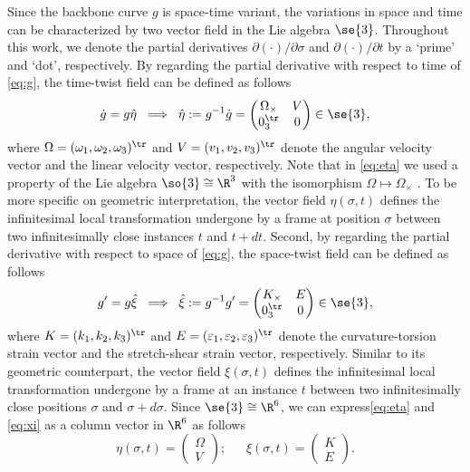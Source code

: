 Since the backbone curve $g$ is space-time variant, the variations in space and time can be characterized by two vector field in the Lie algebra $\se{3}$. Throughout this work, we denote the partial derivatives ${\partial (\cdot)}/{\partial \sigma}$ and ${\partial (\cdot)}/{\partial t}$  by a `prime' and `dot', respectively. By regarding the partial derivative with respect to time of \eqref{eq:g}, the time-twist field can be defined as follows
\begin{equation}
\dot{g} = g \hat{\eta}\; \implies \; \hat{\eta} := g^{-1} \dot{g} = \begin{pmatrix} {\Omega}_\times & V \\ 0_3^\tr & 0 \end{pmatrix} \in \se{3},
\label{eq:eta}
\end{equation}
where $\Omega = (\omega_1, \omega_2, \omega_3)^\tr$ and $V = (v_1, v_2, v_3)^\tr$ denote the angular velocity vector and the linear velocity vector, respectively. Note that in \eqref{eq:eta} we used a property of the Lie algebra $\so{3} \cong \R^3$ with the isomorphism $\Omega \mapsto \Omega_\times$ \cite{Murray1994}. To be more specific on geometric interpretation, the vector field $\eta(\sigma,t)$ defines the infinitesimal local transformation undergone by a frame at position $\sigma$ between two infinitesimally close instances $t$ and $t + dt$. Second, by regarding the partial derivative with respect to space of \eqref{eq:g}, the space-twist field can be defined as follows
\begin{equation}
{g}' = g \hat{\xi} \; \implies \; \hat{\xi} :=  g^{-1} g' = \begin{pmatrix} {K}_\times & E \\ 0_3^\tr & 0 \end{pmatrix} \in \se{3},
\label{eq:xi}
\end{equation}
where $K = (k_1, k_2, k_3)^\tr$ and $E = (\varepsilon_1, \varepsilon_2, \varepsilon_3)^\tr$ denote the curvature-torsion strain vector and the stretch-shear strain vector, respectively. Similar to its geometric counterpart, the vector field $\xi(\sigma,t)$ defines the infinitesimal local transformation undergone by a frame at an instance $t$ between two infinitesimally close positions $\sigma$ and $\sigma + d\sigma$. Since $\se{3} \cong \R^6$, we can express\eqref{eq:eta} and \eqref{eq:xi} as a column vector in $\R^6$ as follows
\begin{equation}
\eta(\sigma,t) = \begin{pmatrix} \Omega \\ V \end{pmatrix}; \; \quad \;  \xi(\sigma,t) = \begin{pmatrix} K \\ E \end{pmatrix}.
\end{equation}
